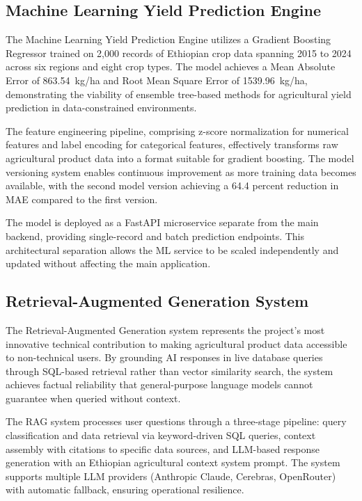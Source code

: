 \subsection{Machine Learning Yield Prediction Engine}

The Machine Learning Yield Prediction Engine utilizes a Gradient Boosting Regressor trained on 2,000 records of Ethiopian crop data spanning 2015 to 2024 across six regions and eight crop types. The model achieves a Mean Absolute Error of 863.54~kg/ha and Root Mean Square Error of 1539.96~kg/ha, demonstrating the viability of ensemble tree-based methods for agricultural yield prediction in data-constrained environments.

The feature engineering pipeline, comprising z-score normalization for numerical features and label encoding for categorical features, effectively transforms raw agricultural product data into a format suitable for gradient boosting. The model versioning system enables continuous improvement as more training data becomes available, with the second model version achieving a 64.4 percent reduction in MAE compared to the first version.

The model is deployed as a FastAPI microservice separate from the main backend, providing single-record and batch prediction endpoints. This architectural separation allows the ML service to be scaled independently and updated without affecting the main application.

\subsection{Retrieval-Augmented Generation System}

The Retrieval-Augmented Generation system represents the project's most innovative technical contribution to making agricultural product data accessible to non-technical users. By grounding AI responses in live database queries through SQL-based retrieval rather than vector similarity search, the system achieves factual reliability that general-purpose language models cannot guarantee when queried without context.

The RAG system processes user questions through a three-stage pipeline: query classification and data retrieval via keyword-driven SQL queries, context assembly with citations to specific data sources, and LLM-based response generation with an Ethiopian agricultural context system prompt. The system supports multiple LLM providers (Anthropic Claude, Cerebras, OpenRouter) with automatic fallback, ensuring operational resilience.

